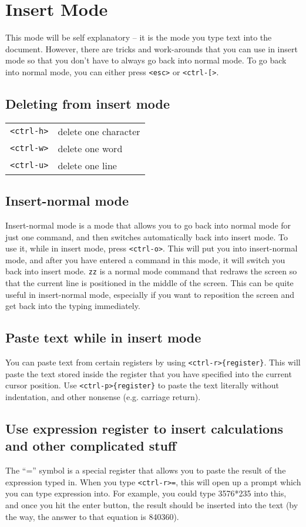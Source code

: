 \section{Insert Mode}

This mode will be self explanatory -- it is the mode you type text into the document.
However, there are tricks and work-arounds that you can use in insert mode so that you don't have to always go back into normal mode.
To go back into normal mode, you can either press \verb|<esc>| or \verb|<ctrl-[>|.

\subsection{Deleting from insert mode}

\begin{tabular}{c|l}
    \verb|<ctrl-h>| & delete one character\\
    \verb|<ctrl-w>| & delete one word\\
    \verb|<ctrl-u>| & delete one line\\
\end{tabular}

\subsection{Insert-normal mode}

Insert-normal mode is a mode that allows you to go back into normal mode for just one command, and then switches automatically back into insert mode.
To use it, while in insert mode, press \verb|<ctrl-o>|.
This will put you into insert-normal mode, and after you have entered a command in this mode, it will switch you back into insert mode.
\verb|zz| is a normal mode command that redraws the screen so that the current line is positioned in the middle of the screen.
This can be quite useful in insert-normal mode, especially if you want to reposition the screen and get back into the typing immediately.

\subsection{Paste text while in insert mode}

You can paste text from certain registers by using \verb|<ctrl-r>{register}|.
This will paste the text stored inside the register that you have specified into the current cursor position.
Use \verb|<ctrl-p>{register}| to paste the text literally without indentation, and other nonsense (e.g. carriage return).

\subsection{Use expression register to insert calculations and other complicated stuff}

The ``='' symbol is a special register that allows you to paste the result of the expression typed in.
When you type \verb|<ctrl-r>=|, this will open up a prompt which you can type expression into.
For example, you could type 3576*235 into this, and once you hit the enter button, the result should be inserted into the text (by the way, the answer to that equation is 840360).
